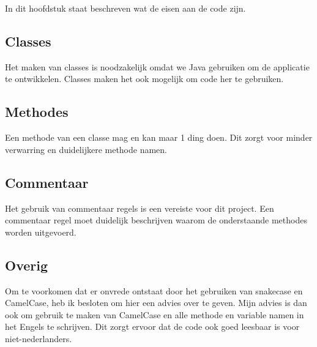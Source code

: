 \documentclass[../main.tex]{subfiles}
\begin{document}
In dit hoofdstuk staat beschreven wat de eisen aan de code zijn.

\subsection{Classes}
Het maken van classes is noodzakelijk omdat we Java gebruiken om de applicatie te ontwikkelen.
Classes maken het ook mogelijk om code her te gebruiken.

\subsection{Methodes}
Een methode van een classe mag en kan maar 1 ding doen.
Dit zorgt voor minder verwarring en duidelijkere methode namen.
\newline

\subsection{Commentaar}
Het gebruik van commentaar regels is een vereiste voor dit project. Een commentaar regel
moet duidelijk beschrijven waarom de onderstaande methodes worden uitgevoerd.
\newline

\subsection{Overig}
Om te voorkomen dat er onvrede ontstaat door het gebruiken van snakecase en CamelCase,
heb ik besloten om hier een advies over te geven.
\newline
Mijn advies is dan ook om gebruik te maken van CamelCase en alle methode en variable
namen in het Engels te schrijven. Dit zorgt ervoor dat de code ook goed leesbaar is voor
niet-nederlanders.
\end{document}
